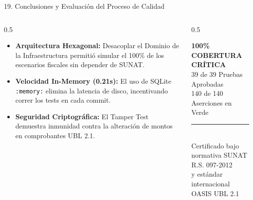 \documentclass[aspectratio=169,10pt]{beamer}
\begin{document}
\begin{frame}{19. Conclusiones y Evaluación del Proceso de Calidad}
\begin{columns}
\begin{column}{0.5\textwidth}
    \begin{tcolorbox}[colback=cardbg, colframe=cardbg, title=\color{accentblue}\bfseries Conclusiones de Ingeniería de QA]
        \begin{itemize}
            \item \textbf{Arquitectura Hexagonal:} Desacoplar el Dominio de la Infraestructura permitió simular el 100\% de los escenarios fiscales sin depender de SUNAT.
            \item \textbf{Velocidad In-Memory (0.21s):} El uso de SQLite \texttt{:memory:} elimina la latencia de disco, incentivando correr los tests en cada commit.
            \item \textbf{Seguridad Criptográfica:} El Tamper Test demuestra inmunidad contra la alteración de montos en comprobantes UBL 2.1.
        \end{itemize}
    \end{tcolorbox}
\end{column}
\begin{column}{0.5\textwidth}
    \begin{tcolorbox}[colback=cardbg, colframe=cardbg, title=\color{accentgreen}\bfseries Certificación del Software]
        \begin{center}
            {\fontsize{10pt}{12pt}\selectfont\color{accentgreen}\bfseries 100\% COBERTURA CRÍTICA}\\[0.08cm]
            {\fontsize{6.8pt}{8pt}\selectfont\color{textwhite}39 de 39 Pruebas Aprobadas}\\[0.05cm]
            {\fontsize{6.8pt}{8pt}\selectfont\color{textwhite}140 de 140 Aserciones en Verde}\\[0.15cm]
            \rule{0.8\textwidth}{0.3pt}\\[0.15cm]
            {\fontsize{6pt}{7pt}\selectfont\color{textgray}
            Certificado bajo normativa SUNAT R.S. 097-2012\\
            y estándar internacional OASIS UBL 2.1
            }
        \end{center}
    \end{tcolorbox}
\end{column}
\end{columns}
\end{frame}
\end{document}
